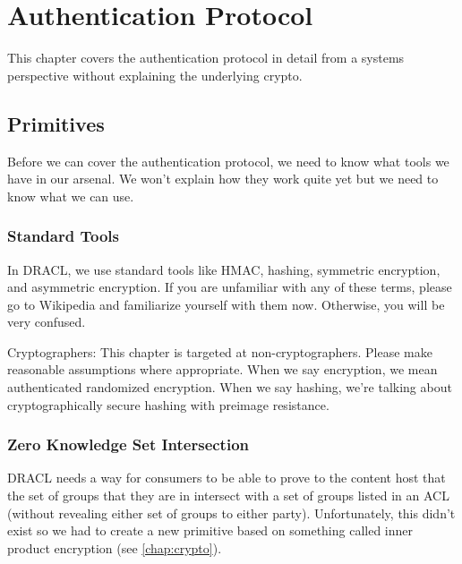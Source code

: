 \documentclass[pdftex,12pt,a4papaer,twoside,notitlepage]{report}
\DeclareMathOperator{\Vvec}{\mathtt{Verifier}}
\DeclareMathOperator{\PvecP}{\mathtt{ProverPublic}}
\DeclareMathOperator{\PvecS}{\mathtt{ProverPrivate}}
\DeclareMathOperator{\PvecG}{\mathtt{ProverGenerator}}
\DeclareMathOperator{\Cvec}{\mathtt{Challenge}}
\DeclareMathOperator{\mCvec}{\mathtt{MakeChallenge}}
\begin{document}
\chapter{Authentication Protocol}
\label{chap:auth}

\newcommand{\Vv}{\Vvec(\mathbb{A})}
\newcommand{\Cv}{\Cvec(s_1, \mathbb{B})}
\newcommand{\mCv}{\mCvec(s_1, \mathbb{B})}
\newcommand{\Pv}{\PvecP(\mathbb{B})}
\newcommand{\Sv}{\PvecS(\mathbb{B})}
\newcommand{\Pvg}{\PvecG(\mathbb{B})}

This chapter covers the authentication protocol in detail from a systems
perspective without explaining the underlying crypto.

\section{Primitives}

Before we can cover the authentication protocol, we need to know what tools we
have in our arsenal. We won't explain how they work quite yet but we need to
know what we can use.

\subsection{Standard Tools}

In DRACL, we use standard tools like HMAC, hashing, symmetric encryption, and
asymmetric encryption. If you are unfamiliar with any of these terms, please go
to Wikipedia and familiarize yourself with them now. Otherwise, you will be very
confused.

Cryptographers: This chapter is targeted at non-cryptographers. Please make
reasonable assumptions where appropriate. When we say encryption, we mean
authenticated randomized encryption. When we say hashing, we're talking about
cryptographically secure hashing with preimage resistance.

\subsection{Zero Knowledge Set Intersection}

DRACL needs a way for consumers to be able to prove to the content host that the
set of groups that they are in intersect with a set of groups listed in an ACL
(without revealing either set of groups to either party). Unfortunately, this
didn't exist so we had to create a new primitive based on something called inner
product encryption (see \cref{chap:crypto}).
\end{document}
